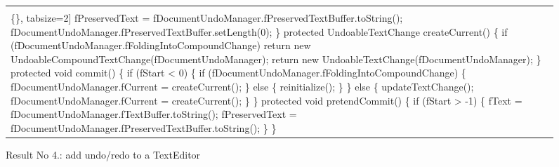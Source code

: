 \begin{figure*}[!htb]
\begin{minipage}{1\textwidth}
\begin{tabular}{@{}p{}}
\begin{Verbatim}[commandchars=\\\{\}, tabsize=2]
   fPreservedText = fDocumentUndoManager.fPreservedTextBuffer.toString();
   fDocumentUndoManager.fPreservedTextBuffer.setLength(0);
\}
 protected UndoableTextChange createCurrent() \{
   if (fDocumentUndoManager.fFoldingIntoCompoundChange)
     return new UndoableCompoundTextChange(fDocumentUndoManager);
  return new UndoableTextChange(fDocumentUndoManager);
 \}
protected void commit() \{
  if (fStart < 0) \{
  if (fDocumentUndoManager.fFoldingIntoCompoundChange) \{
   fDocumentUndoManager.fCurrent = createCurrent();
  \} else \{
   reinitialize();
  \} \} else \{
   updateTextChange();
   fDocumentUndoManager.fCurrent = createCurrent();
  \} \}
 protected void pretendCommit() \{
    if (fStart > -1) \{
       fText = fDocumentUndoManager.fTextBuffer.toString();
       fPreservedText = fDocumentUndoManager.fPreservedTextBuffer.toString();
 \} \}
  \end{Verbatim}
      \vspace{-4mm}
     \\ \hline
\end{tabular} 
\caption{Result No 4.: add undo/redo to a TextEditor}
\label{fig:undoEditor}
\end{minipage}
\end{figure*}






